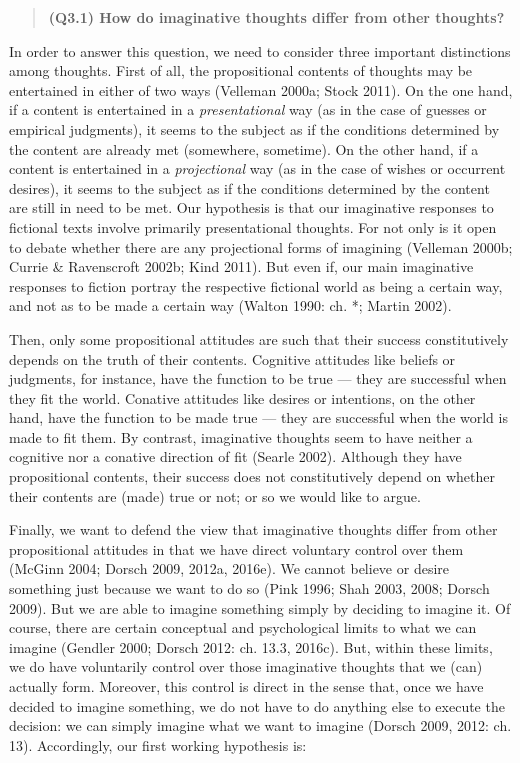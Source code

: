 \vspace{-.2cm}
\begin{quote}
\textbf{(Q3.1) How do imaginative thoughts differ from other thoughts?}
\end{quote}
\vspace{-.2cm}

\noindent In order to answer this question, we need to consider three important distinctions among thoughts. First of all, the propositional contents of thoughts may be entertained in either of two ways (Velleman 2000a; Stock 2011). On the one hand, if a content is entertained in a \emph{presentational} way (as in the case of guesses or empirical judgments), it seems to the subject as if the conditions determined by the content are already met (somewhere, sometime). On the other hand, if a content is entertained in a \emph{projectional} way (as in the case of wishes or occurrent desires), it seems to the subject as if the conditions determined by the content are still in need to be met. Our hypothesis is that our imaginative responses to fictional texts involve primarily presentational thoughts. For not only is it open to debate whether there are any projectional forms of imagining (Velleman 2000b; Currie \& Ravenscroft 2002b; Kind 2011). But even if, our main imaginative responses to fiction portray the respective fictional world as being a certain way, and not as to be made a certain way (Walton 1990: ch. *; Martin 2002).

Then, only some propositional attitudes are such that their success constitutively depends on the truth of their contents. Cognitive attitudes like beliefs or judgments, for instance, have the function to be true --- they are successful when they fit the world. Conative attitudes like desires or intentions, on the other hand, have the function to be made true --- they are successful when the world is made to fit them. By contrast, imaginative thoughts seem to have neither a cognitive nor a conative direction of fit (Searle 2002). Although they have propositional contents, their success does not constitutively depend on whether their contents are (made) true or not; or so we would like to argue.

Finally, we want to defend the view that imaginative thoughts differ from other propositional attitudes in that we have direct voluntary control over them (McGinn 2004; Dorsch 2009, 2012a, 2016e). We cannot believe or desire something just because we want to do so (Pink 1996; Shah 2003, 2008; Dorsch 2009). But we are able to imagine something simply by deciding to imagine it. Of course, there are certain conceptual and psychological limits to what we can imagine (Gendler 2000; Dorsch 2012: ch. 13.3, 2016c). But, within these limits, we do have voluntarily control over those imaginative thoughts that we (can) actually form. Moreover, this control is direct in the sense that, once we have decided to imagine something, we do not have to do anything else to execute the decision: we can simply imagine what we want to imagine (Dorsch 2009, 2012: ch. 13). Accordingly, our first working hypothesis is:

